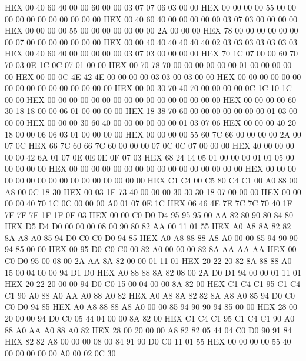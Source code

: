 \documentclass[10pt]{report}
\begin{document}
    HEX     00 40 60 40 00 00 60 00 00 03 07 07 06 03 00 00
    HEX     00 00 00 00 55 00 00 00 00 00 00 00 00 00 00 00
    HEX     00 40 60 40 00 00 00 00 00 03 07 03 00 00 00 00
    HEX     00 00 00 00 55 00 00 00 00 00 00 00 2A 00 00 00
    HEX     78 00 00 00 00 00 00 00 07 00 00 00 00 00 00 00
    HEX     00 00 40 40 40 40 40 40 02 03 03 03 03 03 03 03
    HEX     00 40 60 40 00 00 00 00 00 03 07 03 00 00 00 00
    HEX     70 1C 07 00 00 60 70 70 03 0E 1C 0C 07 01 00 00
    HEX     00 70 78 70 00 00 00 00 00 00 01 00 00 00 00 00
    HEX     00 00 0C 4E 42 4E 00 00 00 00 03 03 00 03 00 00
    HEX     00 00 00 00 00 00 00 00 00 00 00 00 00 00 00 00
    HEX     00 00 30 70 40 70 00 00 00 00 0C 1C 10 1C 00 00
    HEX     00 00 00 00 00 00 00 00 00 00 00 00 00 00 00 00
    HEX     00 00 00 00 60 30 18 18 00 00 06 01 00 00 00 00
    HEX     18 38 70 60 00 00 00 00 00 00 00 01 03 00 00 00
    HEX     00 00 00 30 60 40 00 00 00 00 00 00 01 03 07 06
    HEX     00 00 00 40 20 18 00 00 06 06 03 01 00 00 00 00
    HEX     00 00 00 00 55 60 7C 66 00 00 00 00 2A 00 07 0C
    HEX     66 7C 60 66 7C 60 00 00 00 07 0C 0C 07 00 00 00
    HEX     40 00 00 00 00 00 42 6A 01 07 0E 0E 0E 0F 07 03
    HEX     68 24 14 05 01 00 00 00 01 01 05 00 00 00 00 00
    HEX     00 00 00 00 00 00 00 00 00 00 00 00 00 00 00 00
    HEX     00 00 00 00 00 00 00 00 00 00 00 00 00 00 00 00
    HEX     C1 C4 00 C5 80 C4 C1 00 A0 88 00 A8 00 0C 18 30
    HEX     00 03 1F 73 40 00 00 00 30 30 30 18 07 00 00 00
    HEX     00 00 00 00 40 70 1C 0C 00 00 00 A0 01 07 0E 1C
    HEX     06 46 4E 7E 7C 7C 70 40 1F 7F 7F 7F 1F 1F 0F 03
    HEX     00 00 C0 D0 D4 95 95 95 00 AA 82 80 90 80 84 80
    HEX     D5 D4 D0 00 00 00 08 00 90 80 82 AA 00 11 01 55
    HEX     A0 A8 8A 82 82 8A A8 A0 85 94 D0 C0 C0 D0 94 85
    HEX     A0 A8 88 88 A8 A0 00 00 85 94 90 90 94 85 00 00
    HEX     00 95 D0 C0 C0 00 82 A0 00 00 00 82 8A AA AA AA
    HEX     00 C0 D0 95 00 08 00 2A AA 8A 82 00 00 01 11 01
    HEX     20 22 20 82 8A 88 88 A0 15 00 04 00 00 94 D1 D0
    HEX     A0 88 88 8A 82 08 00 2A D0 D1 94 00 00 01 11 01
    HEX     20 22 20 00 00 94 D0 C0 15 00 04 00 00 8A 82 00
    HEX     C1 C4 C1 95 C1 C4 C1 90 A0 88 A0 AA A0 88 A0 82
    HEX     A0 A8 8A 82 82 8A A8 A0 85 94 D0 C0 C0 D0 94 85
    HEX     A0 A8 88 88 A8 A0 00 00 85 94 90 90 94 85 00 00
    HEX     28 00 20 00 00 94 D0 C0 05 44 04 00 00 8A 82 00
    HEX     C1 C4 C1 95 C1 C4 C1 90 A0 88 A0 AA A0 88 A0 82
    HEX     28 00 20 00 00 A8 82 82 05 44 04 C0 D0 90 91 84
    HEX     82 82 A8 00 00 00 08 00 84 91 90 D0 C0 11 01 55
    HEX     00 00 00 00 55 40 00 00 00 00 00 A0 00 02 0C 30
\end{document}
